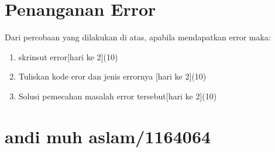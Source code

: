 \section{Penanganan Error}
Dari percobaan yang dilakukan di atas, apabila mendapatkan error maka:

\begin{enumerate}
	\item
	skrinsut error[hari ke 2](10)
	\item
Tuliskan kode eror dan jenis errornya [hari ke 2](10)
	\item
Solusi pemecahan masalah error tersebut[hari ke 2](10)

\end{enumerate}


\section{andi muh aslam/1164064}
